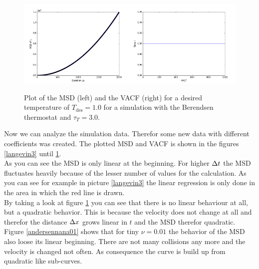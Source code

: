 \begin{figure}[ht]
	\centering
	\includegraphics[width=0.5\textwidth]{../dat/berendsen_T1d0_tau3d0_MSD.png}\includegraphics[width=0.5\textwidth]{../dat/berendsen_T1d0_tau3d0_VACF.png}
	\caption{
		Plot of the MSD (left) and the VACF (right) for a desired temperature of $T_\text{des}=1.0$ for a simulation with the Berendsen thermostat and $\tau_T =3.0$.
	}
	\label{berendsenana}
\end{figure}

Now we can analyze the simulation data.
Therefor some new data with different coefficients was created.
The plotted MSD and VACF is shown in the figures \ref{langevin3} until \ref{berendsenana}.\\

As you can see the MSD is only linear at the beginning. 
For higher $\Delta t$ the MSD fluctuates heavily because of the lesser number of values for the calculation.
As you can see for example in picture \ref{langevin3} the linear regression is only done in the area in which the red line is drawn.\\

By taking a look at figure \ref{berendsenana} you can see that there is no linear behaviour at all, but a quadratic behavior.
This is because the velocity does not change at all and therefor the distance $\Delta x$ grows linear in $t$ and the MSD therefor quadratic.\\

Figure \ref{andersennana01} shows that for tiny $\nu =0.01$ the behavior of the MSD also loose its linear beginning. 
There are not many collisions any more and the velocity is changed not often.
As consequence the curve is build up from quadratic like sub-curves.\\

